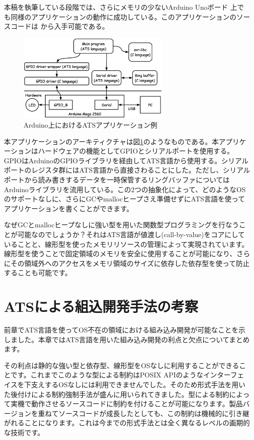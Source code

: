 \documentclass{ipsjprosym}
\begin{document}
本稿を執筆している段階では、さらにメモリの少ないArduino Unoボード \cite{arduino-uno} 上でも同様のアプリケーションの動作に成功している。このアプリケーションのソースコードは \cite{arduino-ats} から入手可能である。

\begin{figure}[h]
\centering
\includegraphics[width=75mm]{draw/demo_ats_arduino.eps}
\caption{Arduino上におけるATSアプリケーション例}
\label{fig:demo_ats_arduino}
\end{figure}

本アプリケーションのアーキティクチャは図\ref{fig:demo_ats_arduino}のようなものである。本アプリケーションはハードウェアの機能としてGPIOとシリアルポートを使用する。GPIOはArduinoのGPIOライブラリを経由してATS言語から使用する。シリアルポートのレジスタ群にはATS言語から直接さわることにした。ただし、シリアルポートから読み書きするデータを一時保管するリングバッファについてはArduinoライブラリを流用している。この2つの抽象化によって、どのようなOSのサポートなしに、さらにGCやmallocヒープさえ準備せずにATS言語を使ってアプリケーションを書くことができます。

なぜGCとmallocヒープなしに強い型を用いた関数型プログラミングを行なうことが可能なのでしょうか？それはATS言語が値渡し(call-by-value)をコアにしていることと、線形型を使ったメモリリソースの管理によって実現されています。線形型を使うことで固定領域のメモリを安全に使用することが可能になり、さらにその領域外へのアクセスをメモリ領域のサイズに依存した依存型を使って防止することも可能です。

\section{ATSによる組込開発手法の考察}

前章でATS言語を使ってOS不在の領域における組み込み開発が可能なことを示しました。本章ではATS言語を用いた組み込み開発の利点と欠点についてまとめます。

その利点は静的な強い型と依存型、線形型をOSなしに利用することができることです。これまでこのような型による制約はPOSIX APIのようなインターフェイスを下支えするOSなしには利用できませんでした。そのため形式手法を用いた後付けによる制約強制手法が盛んに用いられてきました。型による制約によって実機で動作させるソースコードに制約を付けることが可能になります。製品バージョンを重ねてソースコードが成長したとしても、この制約は機械的に引き継がれることになります。これは今までの形式手法とは全く異なるレベルの画期的な技術です。
\end{document}
